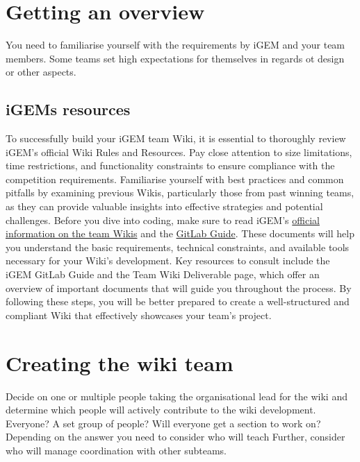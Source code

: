 

    \section{Getting an overview} \label{sec:project-overview}
    You need to familiarise yourself with the requirements by iGEM and your team members.
    Some teams set high expectations for themselves in regards ot design or other aspects.
    \subsection{iGEMs resources} \label{subsec:reading-igem-resources}
    To successfully build your iGEM team Wiki, it is essential to thoroughly review iGEM’s official Wiki Rules and Resources. 
    Pay close attention to size limitations, time restrictions, and functionality constraints to ensure compliance with the competition requirements. 
    Familiarise yourself with best practices and common pitfalls by examining previous Wikis, particularly those from past winning teams, as they can provide valuable insights into effective strategies and potential challenges. \newline
    Before you dive into coding, make sure to read iGEM’s \href{https://competition.igem.org/deliverables/team-Wiki}{official information on the team Wikis} and the \href{https://competition.igem.org/deliverables/gitlab-guide}{GitLab Guide}.
    These documents will help you understand the basic requirements, technical constraints, and available tools necessary for your Wiki's development. 
    Key resources to consult include the iGEM GitLab Guide and the Team Wiki Deliverable page, which offer an overview of important documents that will guide you throughout the process. \newline
    By following these steps, you will be better prepared to create a well-structured and compliant Wiki that effectively showcases your team’s project.

    \section{Creating the wiki team} \label{sec:creating-wiki-team}
    Decide on one or multiple people taking the organisational lead for the wiki and determine which people will
    actively contribute to the wiki development.
    Everyone?
    A set group of people?
    Will everyone get a section to work on? \\
    Depending on the answer you need to consider who will teach
    Further, consider who will manage coordination with other subteams.

